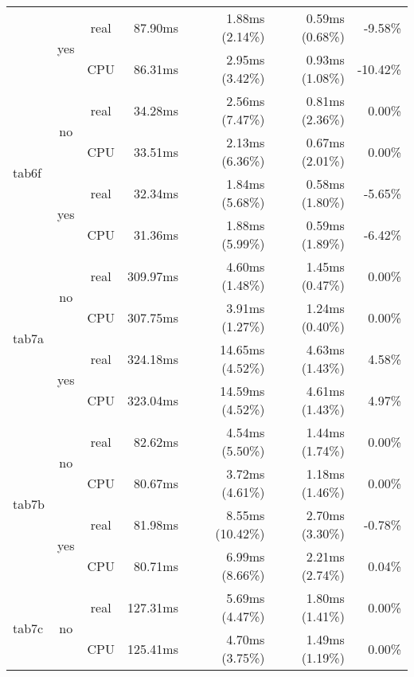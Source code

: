 \documentclass[en]{pracamgr}
\begin{document}
\begin{appendices}
\begin{small}
\begin{longtable}{|l|c|c|r|r|r|r|}
                          \cline{2-7}
                          & \multirow{2}{*}{yes} & real & 87.90ms & 1.88ms (2.14\%) & 0.59ms (0.68\%) & -9.58\% \\*
                          &                      & CPU  & 86.31ms & 2.95ms (3.42\%) & 0.93ms (1.08\%) & -10.42\% \\
\hline
\multirow{4}{*}{tab6f}    & \multirow{2}{*}{no}  & real & 34.28ms & 2.56ms (7.47\%) & 0.81ms (2.36\%) & 0.00\% \\*
                          &                      & CPU  & 33.51ms & 2.13ms (6.36\%) & 0.67ms (2.01\%) & 0.00\% \\*
                          \cline{2-7}
                          & \multirow{2}{*}{yes} & real & 32.34ms & 1.84ms (5.68\%) & 0.58ms (1.80\%) & -5.65\% \\*
                          &                      & CPU  & 31.36ms & 1.88ms (5.99\%) & 0.59ms (1.89\%) & -6.42\% \\
\hline
\multirow{4}{*}{tab7a}    & \multirow{2}{*}{no}  & real & 309.97ms & 4.60ms (1.48\%) & 1.45ms (0.47\%) & 0.00\% \\*
                          &                      & CPU  & 307.75ms & 3.91ms (1.27\%) & 1.24ms (0.40\%) & 0.00\% \\*
                          \cline{2-7}
                          & \multirow{2}{*}{yes} & real & 324.18ms & 14.65ms (4.52\%) & 4.63ms (1.43\%) & 4.58\% \\*
                          &                      & CPU  & 323.04ms & 14.59ms (4.52\%) & 4.61ms (1.43\%) & 4.97\% \\
\hline
\multirow{4}{*}{tab7b}    & \multirow{2}{*}{no}  & real & 82.62ms & 4.54ms (5.50\%) & 1.44ms (1.74\%) & 0.00\% \\*
                          &                      & CPU  & 80.67ms & 3.72ms (4.61\%) & 1.18ms (1.46\%) & 0.00\% \\*
                          \cline{2-7}
                          & \multirow{2}{*}{yes} & real & 81.98ms & 8.55ms (10.42\%) & 2.70ms (3.30\%) & -0.78\% \\*
                          &                      & CPU  & 80.71ms & 6.99ms (8.66\%) & 2.21ms (2.74\%) & 0.04\% \\
\hline
\multirow{4}{*}{tab7c}    & \multirow{2}{*}{no}  & real & 127.31ms & 5.69ms (4.47\%) & 1.80ms (1.41\%) & 0.00\% \\*
                          &                      & CPU  & 125.41ms & 4.70ms (3.75\%) & 1.49ms (1.19\%) & 0.00\% \\*

\end{longtable}
\end{small}
\end{appendices}
\end{document}

